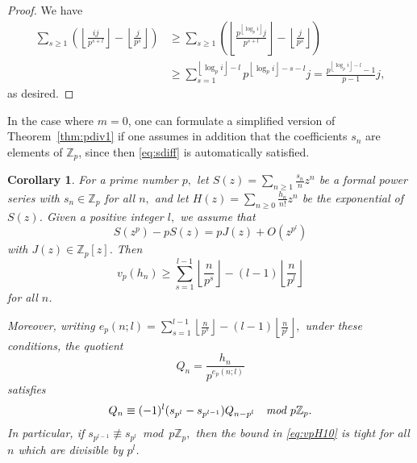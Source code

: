 \documentclass[12pt,reqno]{amsart}
\numberwithin{equation}{section}
\newtheorem{corollary}[theorem]{Corollary}
\theoremstyle{remark}
\begin{document}
\begin{proof}
We have
\begin{align*}
\sum_{s\ge1}
\left({\left\lfloor{\frac {ij} {p^{s+l}}}\right\rfloor}
-
{\left\lfloor{\frac {j} {p^{s}}}\right\rfloor}\right)
&\ge
\sum_{s\ge1}
\left({\left\lfloor{\frac {p^{{\left\lfloor{\log_pi}\right\rfloor}}j} {p^{s+l}}}\right\rfloor}
-
{\left\lfloor{\frac {j} {p^{s}}}\right\rfloor}\right)\\
&\ge
\sum_{s=1} ^{{\left\lfloor{\log_pi}\right\rfloor}-l}
 {p^{{\left\lfloor{\log_pi}\right\rfloor}-s-l}}j
=\frac {p^{{\left\lfloor{\log_pi}\right\rfloor}-l}-1} {p-1}j,
\end{align*}
as desired.
\end{proof}

In the case where $m=0$, one can formulate a simplified version of
Theorem~\ref{thm:pdiv1} if one assumes in addition that the
coefficients $s_n$ are elements of ${\mathbb{Z}}_p$, since then \eqref{eq:sdiff}
is automatically satisfied.

\begin{corollary} \label{thm:pdiv10}
For a prime number $p,$
let\/ $S(z)=\sum_{n\ge1}\frac {s_n} {n}z^n$ be a formal power series
with $s_n\in{\mathbb{Z}}_p$ for all $n,$ and let 
$H(z)=\sum_{n\ge0}\frac {h_n} {n!}z^n$ be the exponential of $S(z)$.
Given a positive integer $l,$ we assume that
\begin{equation} \label{eq:pS10}
S(z^{p})-pS(z)=pJ(z)
+O\left(z^{p^{l}}\right) 
\end{equation}
with $J(z)\in {\mathbb{Z}}_p[z]$.
Then
\begin{equation} \label{eq:vpH10}
v_p(h_n)\ge \sum_{s=1}^{l-1} {\left\lfloor{\frac{n}{p^s}}\right\rfloor}
-(l-1){\left\lfloor{\frac {n} {p^l}}\right\rfloor}
\end{equation}
for all $n$.

Moreover, writing 
$e_p(n;l)=\sum_{s=1}^{l-1}{\left\lfloor{\frac {n} {p^{s}}}\right\rfloor}
-(l-1){\left\lfloor{\frac {n} {p^l}}\right\rfloor},$ 
under these conditions, the quotient
\begin{equation*} 
Q_n=\frac {h_n} 
{p^{e_p(n;l)}}
\end{equation*}
satisfies
\begin{equation} \label{eq:Qrek10} 
Q_n\equiv (-1)^l(s_{p^l}-s_{p^{l-1}})Q_{n-p^l} 
\quad \text{\em mod $p{\mathbb{Z}}_p$}.
\end{equation}
In particular, if 
\hbox{$s_{p^{l-1}}\not\equiv s_{p^{l}}$~{\em mod~$p{\mathbb{Z}}_p,$}}
then the bound in \eqref{eq:vpH10} is tight for all $n$ which are
divisible by $p^l$.
\end{corollary}
\end{document}
